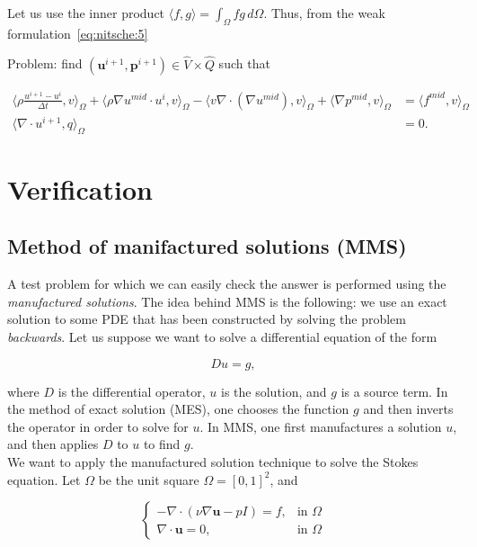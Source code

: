 \documentclass[11pt,a4paper,titlepage]{report}
\begin{document}

Let us use the inner product $\langle f,g \rangle = \int_{\Omega} fg \, d\Omega$. Thus, from the weak formulation~\eqref{eq:nitsche:5}

Problem: find $(\mathbf{u}^{i+1}, \mathbf{p}^{i+1}) \in \hat{V} \times \hat{Q}$ such that

\begin{align}
\langle \rho \frac{u^{i+1} - u^i}{\Delta t},v \rangle_\Omega
+ \langle \rho \nabla u^{mid} \cdot u^i  ,v \rangle_\Omega
- \langle v \nabla \cdot (\nabla u^{mid}) ,v \rangle_\Omega
+ \langle \nabla p^{mid} ,v \rangle_\Omega & = \langle f^{mid} ,v \rangle_\Omega \\
\langle \nabla \cdot u^{i+1},q \rangle_\Omega &=0 .
\end{align}



\chapter{Verification}

\section{Method of manifactured solutions (MMS)}

A test problem for which we can easily check the answer is performed using the \textit{manufactured solutions}. The idea behind MMS is the following: we use an exact solution to some PDE that has been constructed by solving the problem \textit{backwards}. Let us suppose we want to solve a differential equation of the form

\[
Du = g,
\]

where $D$ is the differential operator, $u$ is the solution, and $g$ is a source term. In the method of exact solution (MES), one chooses the function $g$ and then inverts the operator in order to solve for $u$. In MMS, one first manufactures a solution $u$, and then applies $D$ to $u$ to find $g$. \\

We want to apply the manufactured solution technique to solve the Stokes equation. Let $\Omega$ be the unit square $\Omega = [0,1]^2$, and

\vspace{0.2cm}
\[
\begin{cases}
- \nabla \cdot (\nu \nabla \mathbf{u} - pI) = f, & \mbox{in } \Omega \\
\nabla \cdot \mathbf{u} = 0, & \mbox{in } \Omega
\end{cases}
\]
\vspace{0.2cm}
\end{document}
